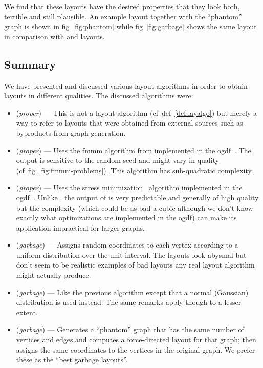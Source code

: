 \documentclass{graphstudy}
\begin{document}
We find that these  layouts have the desired properties that they look both, terrible and still plausible.
An example  layout together with the \enquote{phantom} graph is shown in \acl{fig}~\ref{fig:phantom} while
\acl{fig}~\ref{fig:garbage} shows the same layout in comparison with  and 
layouts.

\subsection{Summary}

We have presented and discussed various layout algorithms in order to obtain layouts in different qualities.  The
discussed algorithms were:

\begin{itemize}
\item{} (\emph{proper}) --- This is not a layout algorithm (\acs{cf}~\acs{def}~\ref{def:layalgo}) but
  merely a way to refer to layouts that were obtained from external sources such as byproducts from graph generation.
\item{} (\emph{proper}) --- Uses the \acl*{fmmm} algorithm from \textcite{Hachul2005} implemented in the
  \ac{ogdf}~\cite{OGDF}.  The output is sensitive to the random seed and might vary in quality
  (\acs{cf}~\acs{fig}~\ref{fig:fmmm-problems}).  This algorithm has sub-quadratic complexity.
\item{} (\emph{proper}) --- Uses the stress minimization~\cite{Kamada1989} algorithm implemented in the
  \ac{ogdf}~\cite{OGDF}.  Unlike , the output of  is very predictable and generally of high
  quality but the complexity (which could be as bad a cubic although we don't know exactly what optimizations are
  implemented in the \acs*{ogdf}) can make its application impractical for larger graphs.
\item{} (\emph{garbage}) --- Assigns random coordinates to each vertex according to a uniform
  distribution over the unit interval.  The layouts look abysmal but don't seem to be realistic examples of bad layouts
  any real layout algorithm might actually produce.
\item{} (\emph{garbage}) --- Like the previous algorithm except that a normal (Gaussian) distribution
  is used instead.  The same remarks apply though to a lesser extent.
\item{} (\emph{garbage}) --- Generates a \enquote{phantom} graph that has the same number of vertices and
  edges and computes a force-directed layout for that graph; then assigns the same coordinates to the vertices in the
  original graph.  We prefer these as the \enquote{best garbage layouts}.
\end{itemize}
\end{document}
